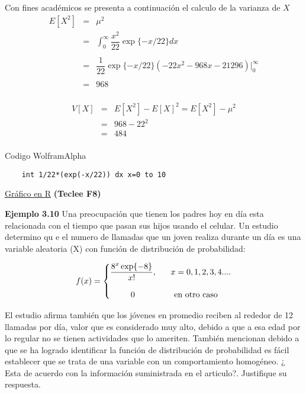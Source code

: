 \documentclass[base=hide,12pt]{elegantbook}
\begin{document}
Con fines académicos se presenta a continuación el calculo de la varianza de $X$\\
%
	\begin{eqnarray*}
	E[X^{2}] & = & \mu^{2} \\
	& = & \int_{0}^{\infty} \dfrac{x^{2}}{22} \exp\{-x/22\} dx\\
	&&\\
	& = & \dfrac{1}{22} \exp\{-x/22\} (-22x^{2}-968x-21296)\Big|_{0}^{\infty} \\
	&&\\
	& = & 968 \\
\end{eqnarray*}

	\begin{eqnarray*}
	V[X] & = & E[X^2] - E[X]^2 = E[X^2] - \mu^2 \\
	& = & 968 - 22^2\\
	& = & 484 \\
\end{eqnarray*}

\begin{Box3}{Codigo WolframAlpha}
{\small 
\begin{verbatim}
	int 1/22*(exp(-x/22)) dx x=0 to 10
\end{verbatim}
}
\end{Box3}

\begin{center}
	\href{https://rextester.com/BXPGS58620}{Gráfico en R} \textcolor{col3}{\bf (Teclee F8)}
\end{center}
\vspace{1cm} 
\textcolor{col3}{\bf Ejemplo 3.10}
Una preocupación que tienen los padres hoy en día esta relacionada con el tiempo que pasan sus hijos usando el celular. Un estudio determino qu e el numero de llamadas que un joven realiza durante un día es una variable aleatoria (X) con función de distribución de probabilidad:

$$f(x)=  \left \{ 
\begin{matrix} 
	\dfrac{8^{x} \exp\{-8\}}{x!},   & \hspace{.3cm} x=0,1,2,3,4.... \\ 
	&\\
	0  & \mbox{en otro caso }
\end{matrix}\right.  
$$

El estudio afirma también que los jóvenes en promedio reciben al rededor de 12 llamadas por día, valor que es considerado muy alto, debido a que a esa edad por lo regular  no se tienen actividades que lo ameriten. También mencionan debido a que se ha logrado identificar la función de distribución de probabilidad es fácil establecer que se trata de una variable con un comportamiento homogéneo. ¿ Esta de acuerdo con la información suministrada en el articulo?. Justifique su respuesta.
\end{document}

